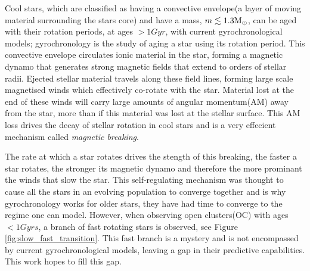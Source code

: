 \documentclass[fleqn,usenatbib]{mnras}
\begin{document}
Cool stars, which are classified as having a convective envelope(a layer of moving material surrounding the stars core) and have a mass, $m \lesssim 1.3 \textup{M}_\odot$, can be aged with their rotation periods, at ages $> 1Gyr$, with current gyrochronological models; gyrochronology is the study of aging a star using its rotation period.
This convective envelope circulates ionic material in the star, forming a magnetic dynamo that generates strong magnetic fields that extend to orders of stellar radii.
Ejected stellar material travels along these field lines, forming large scale magnetised winds which effectively co-rotate with the star.
Material lost at the end of these winds will carry large amounts of angular momentum(AM) away from the star, more than if this material was lost at the stellar surface.
This AM loss drives the decay of stellar rotation in cool stars and is a very effecient mechanism called \textit{magnetic breaking}.

The rate at which a star rotates drives the stength of this breaking, the faster a star rotates, the stronger its magnetic dynamo and therefore the more prominant the winds that slow the star.
This self-regulating mechanism was thought to cause all the stars in an evolving population to converge together and is why gyrochronology works for older stars, they have had time to converge to the regime one can model.
However, when observing open clusters(OC) with ages $< 1Gyrs$, a branch of fast rotating stars is observed, see Figure \ref{fig:slow_fast_transition}.
This fast branch is a mystery and is not encompassed by current gyrochronological models, leaving a gap in their predictive capabilities.
This work hopes to fill this gap.

\end{document}

